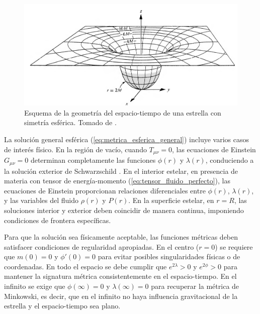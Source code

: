 
\begin{figure}[h]
	\centering
	\includegraphics[width=0.7\linewidth]{Figuras/geometry-misner}
	\caption[Geometría del espacio-tiempo esférico]{Esquema de la geometría del espacio-tiempo de una estrella con simetría esférica. Tomado de \cite{misnerGravitation2017}.}
	\label{fig:geometry-misner}
\end{figure}

La solución general esférica (\ref{eq:metrica_esferica_general}) incluye varios casos de interés físico. En la región de vacío, cuando $T_{\mu\nu} = 0$, las ecuaciones de Einstein $G_{\mu\nu} = 0$ determinan completamente las funciones $\phi(r)$ y $\lambda(r)$, conduciendo a la solución exterior de Schwarzschild \cite{schwarzschildGravitationalFieldMass1999}. En el interior estelar, en presencia de materia con tensor de energía-momento (\ref{eq:tensor_fluido_perfecto}), las ecuaciones de Einstein proporcionan relaciones diferenciales entre $\phi(r)$, $\lambda(r)$, y las variables del fluido $\rho(r)$ y $P(r)$. En la superficie estelar, en $r = R$, las soluciones interior y exterior deben coincidir de manera continua, imponiendo condiciones de frontera específicas.

Para que la solución sea físicamente aceptable, las funciones métricas deben satisfacer condiciones de regularidad apropiadas. En el centro ($r = 0$) se requiere que $m(0) = 0$ y $\phi'(0) = 0$ para evitar posibles singularidades físicas o de coordenadas. En todo el espacio se debe cumplir que $e^{2\lambda} > 0$ y $e^{2\phi} > 0$ para mantener la signatura métrica consistentemente en el espacio-tiempo. En el infinito se exige que $\phi(\infty) = 0$ y $\lambda(\infty) = 0$ para recuperar la métrica de Minkowski, es decir, que en el infinito no haya influencia gravitacional de la estrella y el espacio-tiempo sea plano.


